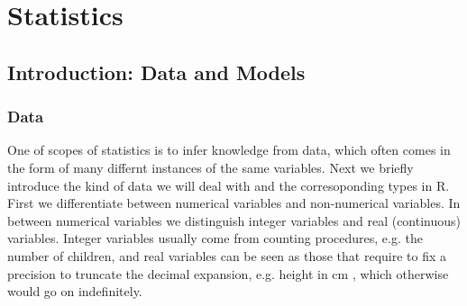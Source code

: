 	







\chapter{ Statistics}

	\section{Introduction: Data and Models}

\subsection{Data}
	\label{ss:data}
	
	One of scopes of statistics is to infer knowledge from data, which often comes in the form of many differnt instances of the same variables. Next we briefly introduce the kind of data we will deal with and the corresoponding types in R. First we differentiate between numerical variables and non-numerical variables. In between numerical variables we distinguish integer variables and real (continuous) variables. Integer variables usually come from counting procedures, e.g. the number of children, and real variables can be seen as those that require to fix a precision to truncate the decimal expansion, e.g. height in cm , which otherwise would go on indefinitely. 

